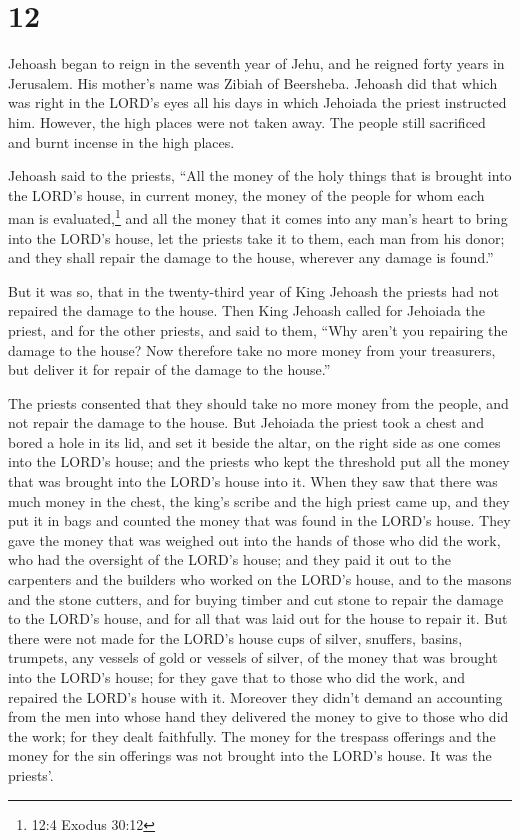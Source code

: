 \hypertarget{section-11}{%
\section{12}\label{section-11}}

 Jehoash began to reign in the seventh year of Jehu, and he
reigned forty years in Jerusalem. His mother's name was Zibiah of
Beersheba.  Jehoash did that which was right in the LORD's
eyes all his days in which Jehoiada the priest instructed him.
 However, the high places were not taken away. The people
still sacrificed and burnt incense in the high places.

 Jehoash said to the priests, ``All the money of the holy
things that is brought into the LORD's house, in current money, the
money of the people for whom each man is evaluated,\footnote{12:4 Exodus
  30:12} and all the money that it comes into any man's heart to bring
into the LORD's house,  let the priests take it to them,
each man from his donor; and they shall repair the damage to the house,
wherever any damage is found.''

 But it was so, that in the twenty-third year of King
Jehoash the priests had not repaired the damage to the house.
 Then King Jehoash called for Jehoiada the priest, and for
the other priests, and said to them, ``Why aren't you repairing the
damage to the house? Now therefore take no more money from your
treasurers, but deliver it for repair of the damage to the house.''

 The priests consented that they should take no more money
from the people, and not repair the damage to the house. 
But Jehoiada the priest took a chest and bored a hole in its lid, and
set it beside the altar, on the right side as one comes into the LORD's
house; and the priests who kept the threshold put all the money that was
brought into the LORD's house into it.  When they saw that
there was much money in the chest, the king's scribe and the high priest
came up, and they put it in bags and counted the money that was found in
the LORD's house.  They gave the money that was weighed out
into the hands of those who did the work, who had the oversight of the
LORD's house; and they paid it out to the carpenters and the builders
who worked on the LORD's house,  and to the masons and the
stone cutters, and for buying timber and cut stone to repair the damage
to the LORD's house, and for all that was laid out for the house to
repair it.  But there were not made for the LORD's house
cups of silver, snuffers, basins, trumpets, any vessels of gold or
vessels of silver, of the money that was brought into the LORD's house;
 for they gave that to those who did the work, and repaired
the LORD's house with it.  Moreover they didn't demand an
accounting from the men into whose hand they delivered the money to give
to those who did the work; for they dealt faithfully.  The
money for the trespass offerings and the money for the sin offerings was
not brought into the LORD's house. It was the priests'.

